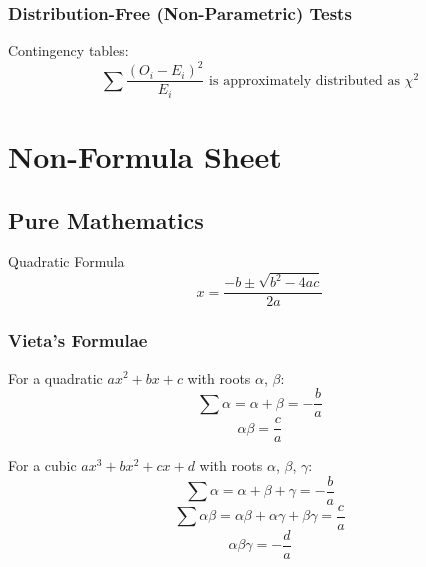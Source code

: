 \documentclass{book}
\begin{document}
        \subsubsection{Distribution-Free (Non-Parametric) Tests}
        Contingency tables:
        \begin{equation}
            \sum \frac{(O_i-E_i)^2}{E_i}\text{ is approximately distributed as }\chi^2
        \end{equation}
        \newpage

    \section{Non-Formula Sheet} \label{non_formula_sheet}
        \subsection{Pure Mathematics}
            Quadratic Formula
            \begin{equation} \label{eq:quadratic_formula}
                x=\frac{-b\pm\sqrt{b^2-4ac}}{2a}
            \end{equation}
        
            \subsubsection{Vieta's Formulae}
                For a \gls{quadratic} $ax^2+bx+c$ with \glspl{root} $\alpha$, $\beta$:
                \begin{equation}
                    \sum\alpha=\alpha+\beta=-\frac{b}{a}
                \end{equation}
                \begin{equation}
                    \alpha\beta=\frac{c}{a}
                \end{equation}

                For a cubic $ax^3+bx^2+cx+d$ with \glspl{root} $\alpha$, $\beta$, $\gamma$:
                \begin{equation}
                    \sum\alpha=\alpha+\beta+\gamma=-\frac{b}{a}
                \end{equation}
                \begin{equation}
                    \sum\alpha\beta=\alpha\beta+\alpha\gamma+\beta\gamma=\frac{c}{a}
                \end{equation}
                \begin{equation}
                    \alpha\beta\gamma=-\frac{d}{a}
                \end{equation}
\end{document}
